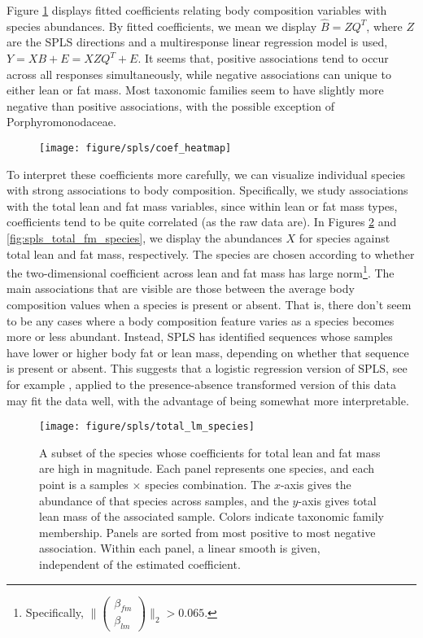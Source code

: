 \documentclass{article}
\begin{document}
Figure \ref{fig:spls_coef_heatmap} displays fitted coefficients relating body
composition variables with species abundances. By fitted coefficients, we mean
we display $\hat{B} = ZQ^T$, where $Z$ are the SPLS directions and a
multiresponse linear regression model is used, $Y = XB + E = XZQ^T + E$. It
seems that, positive associations tend to occur across all responses
simultaneously, while negative associations can unique to either lean or fat
mass. Most taxonomic families seem to have slightly more negative than positive
associations, with the possible exception of Porphyromonodaceae.

\begin{figure}[ht]
  \centering
  \texttt{[image: figure/spls/coef\_heatmap]}
  \caption{\label{fig:spls_coef_heatmap} }
\end{figure}

To interpret these coefficients more carefully, we can visualize individual
species with strong associations to body composition. Specifically, we study
associations with the total lean and fat mass variables, since within lean or
fat mass types, coefficients tend to be quite correlated (as the raw data are).
In Figures \ref{fig:spls_total_lm_species} and \ref{fig:spls_total_fm_species},
we display the abundances $X$ for species against total lean and fat mass,
respectively. The species are chosen according to whether the two-dimensional
coefficient across lean and fat mass has large norm\footnote{Specifically,
  $\| \begin{pmatrix} \beta_{fm} \\ \beta_{lm} \end{pmatrix} \|_{2} > 0.065$.}.
The main associations that are visible are those between the average body
composition values when a species is present or absent. That is, there don't
seem to be any cases where a body composition feature varies as a species
becomes more or less abundant. Instead, SPLS has identified sequences whose
samples have lower or higher body fat or lean mass, depending on whether that
sequence is present or absent. This suggests that a logistic regression version
of SPLS, see for example \citep{chung2010sparse}, applied to the
presence-absence transformed version of this data may fit the data well, with
the advantage of being somewhat more interpretable.

\begin{figure}[ht]
  \centering
  \texttt{[image: figure/spls/total\_lm\_species]}
  \caption{A subset of the species whose coefficients for total lean and fat
    mass are high in magnitude. Each panel represents one species, and each
    point is a samples $\times$ species combination. The $x$-axis gives the
    abundance of that species across samples, and the $y$-axis gives total lean
    mass of the associated sample. Colors indicate taxonomic family membership.
    Panels are sorted from most positive to most negative association. Within
    each panel, a linear smooth is given, independent of the estimated
    coefficient.
    \label{fig:spls_total_lm_species} }
\end{figure}
\end{document}
